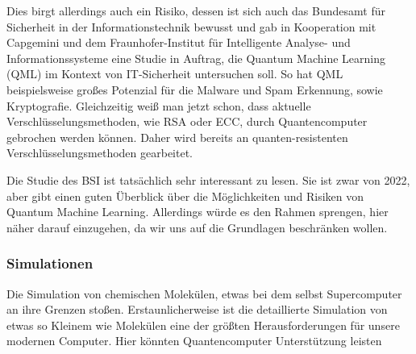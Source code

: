 Dies birgt allerdings auch ein Risiko, dessen ist sich auch das Bundesamt für Sicherheit in der Informationstechnik bewusst und gab in Kooperation mit Capgemini und dem Fraunhofer-Institut für Intelligente Analyse- und Informationssysteme eine Studie in Auftrag, die Quantum Machine Learning (QML) im Kontext von IT-Sicherheit untersuchen soll.
So hat QML beispielsweise großes Potenzial für die Malware und Spam Erkennung, sowie Kryptografie.
Gleichzeitig weiß man jetzt schon, dass aktuelle Verschlüsselungsmethoden, wie RSA oder ECC, durch Quantencomputer gebrochen werden können.
Daher wird bereits an quanten-resistenten Verschlüsselungsmethoden gearbeitet.\\

\begin{tcolorbox}[title=Kommentar,
    title filled=false,
    colback=cyan!5!white,
    colframe=cyan!75!black]
    Die Studie des BSI ist tatsächlich sehr interessant zu lesen.
    Sie ist zwar von 2022, aber gibt einen guten Überblick über die Möglichkeiten und Risiken von Quantum Machine Learning.
    Allerdings würde es den Rahmen sprengen, hier näher darauf einzugehen, da wir uns auf die Grundlagen beschränken wollen.
\end{tcolorbox}

\subsubsection{Simulationen}
\label{subsubsec:simulationen}
Die Simulation von chemischen Molekülen, etwas bei dem selbst Supercomputer an ihre Grenzen stoßen.
Erstaunlicherweise ist die detaillierte Simulation von etwas so Kleinem wie Molekülen eine der größten Herausforderungen für unsere modernen Computer.
Hier könnten Quantencomputer Unterstützung leisten


























































